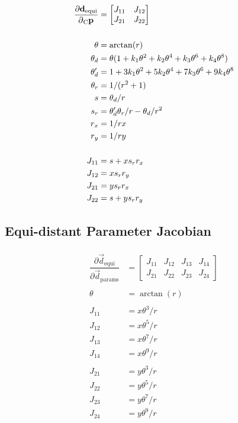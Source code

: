 \begin{align}
\begin{split}
  \dfrac{\partial{{\mathbf{d}}_{\text{equi}}}}{\partial{{{{{}_{{\text{C}}}} {{\mathbf{p}}}_{}}}}} &=
    \begin{bmatrix}
      J_{11} & J_{12} \\
      J_{21} & J_{22}
    \end{bmatrix} \\ \\
    \theta &= \arctan(r) \\
    \theta_d &= \theta (1 + k_1 \theta^2 + k_2 \theta^4 + k_3 \theta^6 + k_4 \theta^8) \\
    \theta_d' &= 1 + 3 k_1 \theta^2 + 5 k_2 \theta^4 + 7 k_3 \theta^6 + 9 k_4 \theta^8 \\
    \theta_r &= 1 / (r^2 + 1) \\
    s &= \theta_d / r \\
    s_r &= \theta_d' \theta_r / r - \theta_d / r^2 \\
    r_x &= 1 / r x \\
    r_y &= 1 / r y \\ \\
    J_{11} &= s + x s_r r_x \\
    J_{12} &= x s_r r_y \\
    J_{21} &= y s_r r_x \\
    J_{22} &= s + y s_r r_y
\end{split}
\end{align}


\subsection{Equi-distant Parameter Jacobian}

\begin{align}
\begin{split}
  \dfrac{\partial{\Vec{d}_{\text{equi}}}}{\partial{\Vec{d}_{\text{params}}}} &=
    \begin{bmatrix}
      J_{11} & J_{12} & J_{13} & J_{14} \\
      J_{21} & J_{22} & J_{23} & J_{24}
    \end{bmatrix} \\ \\
  \theta &= \arctan(r) \\ \\
  J_{11} &= x \theta^3 / r \\
  J_{12} &= x \theta^5 / r \\
  J_{13} &= x \theta^7 / r \\
  J_{14} &= x \theta^9 / r \\ \\
  J_{21} &= y \theta^3 / r \\
  J_{22} &= y \theta^5 / r \\
  J_{23} &= y \theta^7 / r \\
  J_{24} &= y \theta^9 / r
\end{split}
\end{align}



